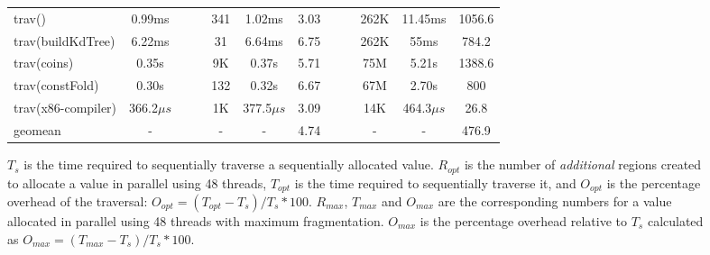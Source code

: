 \documentclass[acmsmall,acmthm=false,nonacm]{acmart}
\theoremstyle{straighttext0}
\theoremstyle{straighttext}
\begin{document}
{{\begin{figure}
\begin{tabular}{l c r ccc r ccc}
    \midrule

    trav(\buildfib{}) & 0.99ms && $\;\;\;$ 341 & 1.02ms & 3.03 && $\;\;\;$ 262K & 11.45ms & 1056.6 \\

    trav(buildKdTree) & 6.22ms && $\;\;\;$ 31 & 6.64ms & 6.75 && $\;\;\;$ 262K & 55ms & 784.2 \\

    trav(coins) & 0.35s && $\;\;\;$ 9K & 0.37s & 5.71 && $\;\;\;$ 75M & 5.21s & 1388.6 \\

    trav(constFold) & 0.30s && $\;\;\;$ 132 & 0.32s & 6.67 && $\;\;\;$ 67M & 2.70s & 800 \\

    trav(x86-compiler) & 366.2$\mu s$ && $\;\;\;$ 1K & 377.5$\mu s$ & 3.09 && $\;\;\;$ 14K & 464.3$\mu s$ & 26.8 \\

    \midrule
    geomean & - && $\;\;\;$ - & - & 4.74 && $\;\;\;$ - & - & 476.9 \\
    \bottomrule
  \end{tabular}
  \caption{
    $T_s$ is the time required to sequentially traverse a sequentially allocated value.
    $R_{\mathit{opt}}$ is the number of {\em additional} regions created to allocate a value in parallel using 48 threads,
    $T_{\mathit{opt}}$ is the time required to sequentially traverse it,
    and $O_{\mathit{opt}}$ is the percentage overhead of the traversal: $O_{\mathit{opt}} = (T_{\mathit{opt}} - T_s) / T_s * 100$.
    $R_{\mathit{max}}$, $T_{\mathit{max}}$ and $O_{\mathit{max}}$ are the corresponding
    numbers for a value allocated in parallel using 48 threads with maximum fragmentation.
    $O_{\mathit{max}}$ is the percentage overhead relative to $T_s$ calculated as
    $O_{\mathit{max}} = (T_{\mathit{max}} - T_s) / T_s * 100$.
  }
\label{fig:fragmentation-results}
\end{figure}
}

}
\end{document}
